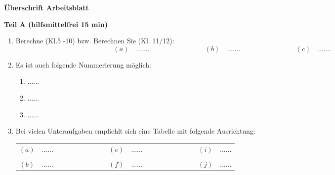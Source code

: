\documentclass[12pt, a4paper]{report} %
\begin{document}
	\begin{center} \textbf{\large{Überschrift Arbeitsblatt}} \end{center}
	\bigskip
	\textbf{Teil A (hilfsmittelfrei 15 min)}
	\begin{enumerate}
		\item Berechne  (Kl.5 -10) bzw. Berechnen Sie (Kl. 11/12):
			\[ (a) \quad ....... \qquad \qquad \qquad \qquad (b) \quad ....... \qquad \qquad \qquad \qquad (c) \quad.......\]
		\item Es ist auch folgende Nummerierung möglich:
			\begin{enumerate}
				\item ......
				\item ......
				\item ......
			\end{enumerate}
		\item Bei vielen Unteraufgaben empfiehlt sich eine Tabelle mit folgende Ausrichtung:
			\begin{center}\begin{tabular}{c l c c l c c l}
				$(a)$ & ...... & $\qquad \qquad \qquad$ & $(e)$ & ...... & $\qquad \qquad \qquad$ & $(i)$ & ......\\
				& & & & & & &\\
				$(b)$ & ...... & $\qquad \qquad \qquad$ & $(f)$ & ...... & $\qquad \qquad \qquad$ & $(j)$ & ......\\

\end{tabular}
\end{center}
\end{enumerate}
\end{document}
